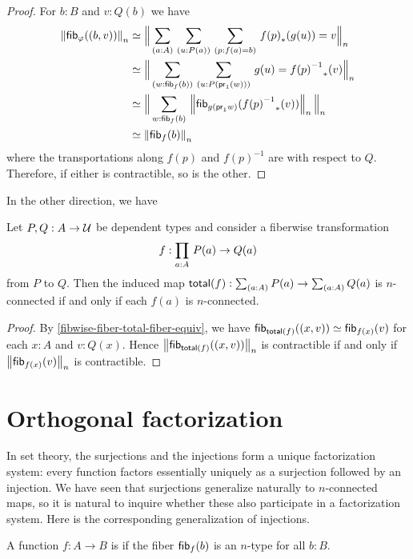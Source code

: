 \begin{proof}
For $b:B$ and $v:Q(b)$ we have
\begin{align*}
\trunc n{\hfib{\varphi}{\pairr{b,v}}} & \simeq \Trunc n{\sm{a:A}{u:P(a)}{p:f(a)= b} \trans{f(p)}{g(u)}= v}\\
& \simeq \Trunc n{\sm{w:\hfib{f}b}{u:P(\proj1(w))} g(u)= \trans{\opp{f(p)}}{v}}\\
& \simeq \Trunc n{\sm{w:\hfib{f}b} \trunc n{\hfib{g(\proj1 w)}{\trans{\opp{f(p)}}{v}}}}\\
& \simeq \trunc n{\hfib{f}b}
\end{align*}
where the transportations along $f(p)$ and $f(p)^{-1}$ are with respect to $Q$.
Therefore, if either is contractible, so is the other.
\end{proof}

In the other direction, we have

\begin{lem}\label{prop:nconn_fiber_to_total}
Let $P,Q:A\to\type$ be dependent types and consider a fiberwise transformation
\begin{equation*}
f:\prd{a:A} P(a)\to Q(a)
\end{equation*}
from $P$ to $Q$. Then the induced map $\total f: \sm{a:A}P(a) \to \sm{a:A} Q(a)$ is $n$-connected if and only if each $f(a)$ is $n$-connected. 
\end{lem}

\begin{proof}
By \autoref{fibwise-fiber-total-fiber-equiv}, we have
$\hfib{\total f}{\pairr{x,v}}\simeq\hfib{f(x)}v$
for each $x:A$ and $v:Q(x)$. Hence $\trunc n{\hfib{\total f}{\pairr{x,v}}}$ is contractible if and only if
$\trunc n{\hfib{f(x)}v}$ is contractible.
\end{proof}


\section{Orthogonal factorization}
\label{sec:image-factorization}

In set theory, the surjections and the injections form a unique factorization system: every function factors essentially uniquely as a surjection followed by an injection.
We have seen that surjections generalize naturally to $n$-connected maps, so it is natural to inquire whether these also participate in a factorization system.
Here is the corresponding generalization of injections.

\begin{defn}
  A function $f:A\to B$ is  if the fiber $\hfib f b$ is an $n$-type for all $b:B$.
\end{defn}

